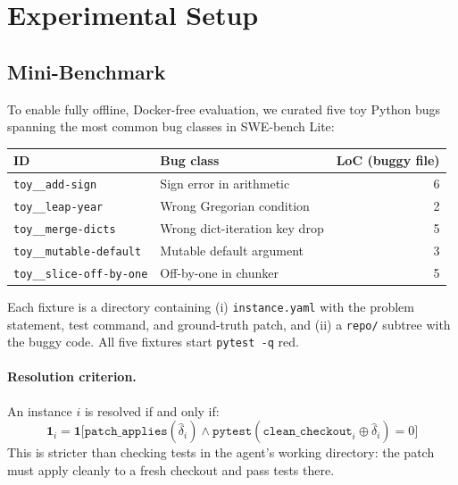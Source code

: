 \documentclass[11pt]{article}
\begin{document}
\section{Experimental Setup}
\label{sec:setup}

\subsection{Mini-Benchmark}
\label{sec:bench}

To enable fully offline, Docker-free evaluation, we curated five toy Python
bugs spanning the most common bug classes in SWE-bench Lite:

\begin{center}
\begin{tabular}{llr}
\toprule
\textbf{ID} & \textbf{Bug class} & \textbf{LoC (buggy file)} \\
\midrule
\texttt{toy\_\_add-sign}        & Sign error in arithmetic          & 6 \\
\texttt{toy\_\_leap-year}       & Wrong Gregorian condition         & 2 \\
\texttt{toy\_\_merge-dicts}     & Wrong dict-iteration key drop     & 5 \\
\texttt{toy\_\_mutable-default} & Mutable default argument          & 3 \\
\texttt{toy\_\_slice-off-by-one}& Off-by-one in chunker             & 5 \\
\bottomrule
\end{tabular}
\end{center}

Each fixture is a directory containing (i) \texttt{instance.yaml} with the
problem statement, test command, and ground-truth patch, and (ii) a \texttt{repo/}
subtree with the buggy code.  All five fixtures start \texttt{pytest -q} red.

\paragraph{Resolution criterion.}  An instance $i$ is resolved if and only if:
\begin{equation}
  \mathbf{1}_i = \mathbf{1}\bigl[\texttt{patch\_applies}(\hat{\delta}_i)
                              \wedge \texttt{pytest}(\texttt{clean\_checkout}_i
                                      \oplus \hat{\delta}_i) = 0\bigr]
  \label{eq:resolution}
\end{equation}
This is stricter than checking tests in the agent's working directory: the
patch must apply cleanly to a fresh checkout and pass tests there.
\end{document}
